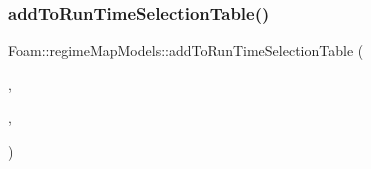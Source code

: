 \subsubsection{\texorpdfstring{add\+To\+Run\+Time\+Selection\+Table()}{addToRunTimeSelectionTable()}\hspace{0.1cm}{\footnotesize\ttfamily [2/2]}}
{\footnotesize\ttfamily Foam\+::regime\+Map\+Models\+::add\+To\+Run\+Time\+Selection\+Table (\begin{DoxyParamCaption}\item[{\hyperlink{classFoam_1_1regimeMapModel}{regime\+Map\+Model}}]{,  }\item[{\hyperlink{classFoam_1_1regimeMapModels_1_1twoParameters}{two\+Parameters}}]{,  }\item[{regime\+Map\+Models}]{ }\end{DoxyParamCaption})}

